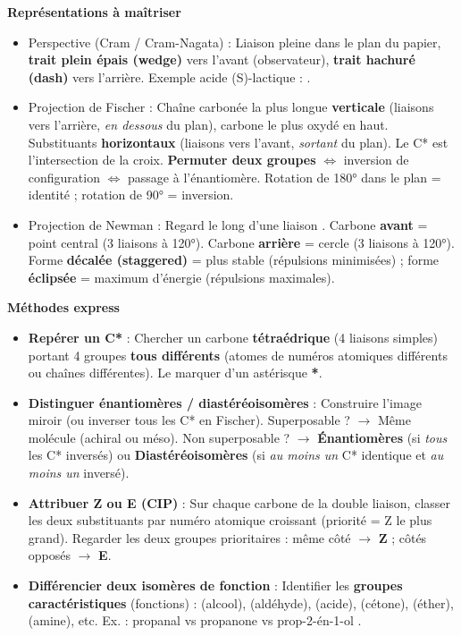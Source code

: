 \documentclass[11pt]{article}
\newcommand{\cle}[1]{{\popxbold\color{popdark}#1}}
\begin{document}
\begin{aretenir}
\textbf{Représentations à maîtriser}
\begin{itemize}
  \item \cle{Perspective (Cram / Cram-Nagata)} : Liaison pleine dans le plan du papier, \textbf{trait plein épais (wedge)} vers l'avant (observateur), \textbf{trait hachuré (dash)} vers l'arrière. Exemple acide (S)-lactique : .
  \item \cle{Projection de Fischer} : Chaîne carbonée la plus longue \textbf{verticale} (liaisons vers l'arrière, \emph{en dessous} du plan), carbone le plus oxydé en haut. Substituants \textbf{horizontaux} (liaisons vers l'avant, \emph{sortant} du plan). Le C* est l'intersection de la croix. \textbf{Permuter deux groupes} $\Leftrightarrow$ inversion de configuration $\Leftrightarrow$ passage à l'énantiomère. Rotation de 180° dans le plan = identité ; rotation de 90° = inversion.
  \item \cle{Projection de Newman} : Regard le long d'une liaison . Carbone \textbf{avant} = point central (3 liaisons à 120°). Carbone \textbf{arrière} = cercle (3 liaisons à 120°). Forme \textbf{décalée (staggered)} = plus stable (répulsions minimisées) ; forme \textbf{éclipsée} = maximum d'énergie (répulsions maximales).
\end{itemize}

\textbf{Méthodes express}
\begin{itemize}
  \item \textbf{Repérer un C*} : Chercher un carbone \textbf{tétraédrique} (4 liaisons simples) portant 4 groupes \textbf{tous différents} (atomes de numéros atomiques différents ou chaînes différentes). Le marquer d'un astérisque \textbf{*}.
  \item \textbf{Distinguer énantiomères / diastéréoisomères} : Construire l'image miroir (ou inverser tous les C* en Fischer). Superposable ? $\rightarrow$ Même molécule (achiral ou méso). Non superposable ? $\rightarrow$ \textbf{Énantiomères} (si \emph{tous} les C* inversés) ou \textbf{Diastéréoisomères} (si \emph{au moins un} C* identique et \emph{au moins un} inversé).
  \item \textbf{Attribuer Z ou E (CIP)} : Sur chaque carbone de la double liaison, classer les deux substituants par numéro atomique croissant (priorité = Z le plus grand). Regarder les deux groupes prioritaires : même côté $\rightarrow$ \textbf{Z} ; côtés opposés $\rightarrow$ \textbf{E}.
  \item \textbf{Différencier deux isomères de fonction} : Identifier les \textbf{groupes caractéristiques} (fonctions) :  (alcool),  (aldéhyde),  (acide),  (cétone),  (éther),  (amine), etc. Ex.  : propanal  vs propanone  vs prop-2-én-1-ol .
\end{itemize}
\end{aretenir}
\end{document}

